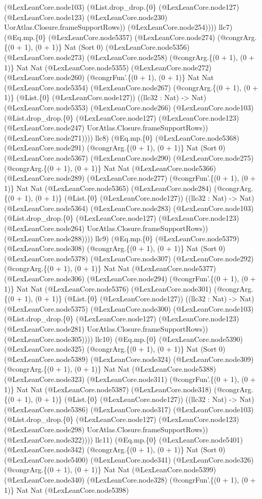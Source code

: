 \documentclass[11pt]{article}
\begin{document}
(@LexLeanCore.node103) (@List.drop\_drop.\{0\} (@LexLeanCore.node127) (@LexLeanCore.node123) (@LexLeanCore.node230) UorAtlas.Closure.frameSupportRows)) (@LexLeanCore.node254)))) llc7) (@Eq.mp.\{0\} (@LexLeanCore.node5357) (@LexLeanCore.node274) (@congrArg.\{(0 + 1), (0 + 1)\} Nat (Sort 0) (@LexLeanCore.node5356) (@LexLeanCore.node273) (@LexLeanCore.node258) (@congrArg.\{(0 + 1), (0 + 1)\} Nat Nat (@LexLeanCore.node5355) (@LexLeanCore.node272) (@LexLeanCore.node260) (@congrFun'.\{(0 + 1), (0 + 1)\} Nat Nat (@LexLeanCore.node5354) (@LexLeanCore.node267) (@congrArg.\{(0 + 1), (0 + 1)\} (@List.\{0\} (@LexLeanCore.node127)) ((llc32 : Nat) -> Nat) (@LexLeanCore.node5353) (@LexLeanCore.node266) (@LexLeanCore.node103) (@List.drop\_drop.\{0\} (@LexLeanCore.node127) (@LexLeanCore.node123) (@LexLeanCore.node247) UorAtlas.Closure.frameSupportRows)) (@LexLeanCore.node271)))) llc8) (@Eq.mp.\{0\} (@LexLeanCore.node5368) (@LexLeanCore.node291) (@congrArg.\{(0 + 1), (0 + 1)\} Nat (Sort 0) (@LexLeanCore.node5367) (@LexLeanCore.node290) (@LexLeanCore.node275) (@congrArg.\{(0 + 1), (0 + 1)\} Nat Nat (@LexLeanCore.node5366) (@LexLeanCore.node289) (@LexLeanCore.node277) (@congrFun'.\{(0 + 1), (0 + 1)\} Nat Nat (@LexLeanCore.node5365) (@LexLeanCore.node284) (@congrArg.\{(0 + 1), (0 + 1)\} (@List.\{0\} (@LexLeanCore.node127)) ((llc32 : Nat) -> Nat) (@LexLeanCore.node5364) (@LexLeanCore.node283) (@LexLeanCore.node103) (@List.drop\_drop.\{0\} (@LexLeanCore.node127) (@LexLeanCore.node123) (@LexLeanCore.node264) UorAtlas.Closure.frameSupportRows)) (@LexLeanCore.node288)))) llc9) (@Eq.mp.\{0\} (@LexLeanCore.node5379) (@LexLeanCore.node308) (@congrArg.\{(0 + 1), (0 + 1)\} Nat (Sort 0) (@LexLeanCore.node5378) (@LexLeanCore.node307) (@LexLeanCore.node292) (@congrArg.\{(0 + 1), (0 + 1)\} Nat Nat (@LexLeanCore.node5377) (@LexLeanCore.node306) (@LexLeanCore.node294) (@congrFun'.\{(0 + 1), (0 + 1)\} Nat Nat (@LexLeanCore.node5376) (@LexLeanCore.node301) (@congrArg.\{(0 + 1), (0 + 1)\} (@List.\{0\} (@LexLeanCore.node127)) ((llc32 : Nat) -> Nat) (@LexLeanCore.node5375) (@LexLeanCore.node300) (@LexLeanCore.node103) (@List.drop\_drop.\{0\} (@LexLeanCore.node127) (@LexLeanCore.node123) (@LexLeanCore.node281) UorAtlas.Closure.frameSupportRows)) (@LexLeanCore.node305)))) llc10) (@Eq.mp.\{0\} (@LexLeanCore.node5390) (@LexLeanCore.node325) (@congrArg.\{(0 + 1), (0 + 1)\} Nat (Sort 0) (@LexLeanCore.node5389) (@LexLeanCore.node324) (@LexLeanCore.node309) (@congrArg.\{(0 + 1), (0 + 1)\} Nat Nat (@LexLeanCore.node5388) (@LexLeanCore.node323) (@LexLeanCore.node311) (@congrFun'.\{(0 + 1), (0 + 1)\} Nat Nat (@LexLeanCore.node5387) (@LexLeanCore.node318) (@congrArg.\{(0 + 1), (0 + 1)\} (@List.\{0\} (@LexLeanCore.node127)) ((llc32 : Nat) -> Nat) (@LexLeanCore.node5386) (@LexLeanCore.node317) (@LexLeanCore.node103) (@List.drop\_drop.\{0\} (@LexLeanCore.node127) (@LexLeanCore.node123) (@LexLeanCore.node298) UorAtlas.Closure.frameSupportRows)) (@LexLeanCore.node322)))) llc11) (@Eq.mp.\{0\} (@LexLeanCore.node5401) (@LexLeanCore.node342) (@congrArg.\{(0 + 1), (0 + 1)\} Nat (Sort 0) (@LexLeanCore.node5400) (@LexLeanCore.node341) (@LexLeanCore.node326) (@congrArg.\{(0 + 1), (0 + 1)\} Nat Nat (@LexLeanCore.node5399) (@LexLeanCore.node340) (@LexLeanCore.node328) (@congrFun'.\{(0 + 1), (0 + 1)\} Nat Nat (@LexLeanCore.node5398) 
\end{document}
